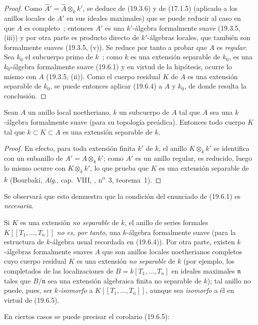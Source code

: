 \begin{proof}
Como $\widehat A'=\widehat A\otimes_k k'$, se deduce de (19.3.6) y de
(17.1.5) (aplicado a los anillos locales de $A'$ en sus ideales maximales) que se
puede reducir al caso en que $A$ es completo~; entonces $A'$ es una $k'$-álgebra
formalmente suave (19.3.5, (iii)) y por otra parte es producto directo de
$k'$-álgebras locales, que también son formalmente suaves (19.3.5, (v)). Se
reduce por tanto a probar que $A$ es \emph{regular}. Sea $k_0$ el subcuerpo
primo de $k$~; como $k$ es una extensión separable de $k_0$, es una
$k_0$-álgebra formalmente suave (19.6.1) y en virtud de la hipótesis, ocurre lo
mismo con $A$ (19.3.5, (ii)). Como el cuerpo residual $K$ de $A$ es una
extensión separable de $k_0$, se puede entonces aplicar (19.6.4) a $A$ y $k_0$,
de donde resulta la conclusión.
\end{proof}

 
\begin{corollary}[19.6.5.1]
\label{0.19.6.5.1-fr}
Sean $A$ un anillo local noetheriano, $k$ un subcuerpo de $A$ tal que $A$
sea una $k$-álgebra formalmente suave (para su topología preádica). Entonces
todo cuerpo $K$ tal que $k\subset K\subset A$ es una extensión separable de
$k$.
\end{corollary}

\begin{proof}
En efecto, para toda extensión finita $k'$ de $k$, el anillo $K\otimes_k k'$
se identifica con un subanillo de $A'=A\otimes_k k'$; como $A'$ es un anillo
regular, es reducido, luego lo mismo ocurre con $K\otimes_k k'$, lo que prueba que $K$
es una extensión separable de $k$ (Bourbaki, \emph{Alg.}, cap.~VIII,
, n\textsuperscript{o}~3, teorema~1).
\end{proof}

Se observará que esto demuestra que la condición del enunciado de (19.6.1) es
\emph{necesaria}.

\begin{remark}[19.6.5.2]
\label{0.19.6.5.2-fr}
Si $K$ es una extensión \emph{no separable} de $k$, el anillo de series
formales $K[[T_1,\ldots,T_n]]$ \emph{no es, por tanto}, una $k$-álgebra
formalmente suave (para la estructura de $k$-álgebra usual recordada en
(19.6.4)). Por otra parte, existen $k$-álgebras formalmente suaves $A$ que
son anillos locales noetherianos completos cuyo cuerpo residual $K$ es una
extensión \emph{no separable} de $k$ (por ejemplo, los completados de las
localizaciones de $B=k[T_1,\ldots,T_n]$ en ideales maximales $\mathfrak n$ tales
que $B/\mathfrak n$ sea una extensión algebraica finita no separable de $k$);
tal anillo no puede, pues, ser \emph{$k$-isomorfo} a $K[[T_1,\ldots,T_n]]$, aunque
sea \emph{isomorfo} a él en virtud de (19.6.5).

En ciertos casos se puede precisar el corolario (19.6.5):
\end{remark}


